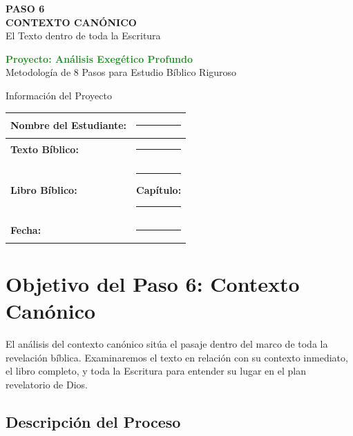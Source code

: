 \documentclass[11pt,a4paper]{article}
\begin{document}
\begin{center}
    {\Huge\color{forestgreen}\textbf{PASO 6}}\\[0.5cm]
    {\Large\color{sagegreen}\textbf{CONTEXTO CANÓNICO}}\\[0.3cm]
    {\large\color{papergray}El Texto dentro de toda la Escritura}\\[1cm]
    
    \begin{tcolorbox}[colback=olivegreen!10, colframe=olivegreen, width=0.8\textwidth]
        \centering
        \textcolor{forestgreen}{\textbf{Proyecto: Análisis Exegético Profundo}}\\
        \textcolor{papergray}{Metodología de 8 Pasos para Estudio Bíblico Riguroso}
    \end{tcolorbox}
\end{center}

\vspace{1cm}

\begin{infobox}{Información del Proyecto}
\begin{tabularx}{\textwidth}{|X|X|}
\hline
\textbf{Nombre del Estudiante:} & \rule{6cm}{0.4pt} \\[0.8cm]
\hline
\textbf{Texto Bíblico:} & \rule{6cm}{0.4pt} \\[0.8cm]
\hline
\textbf{Libro Bíblico:} & \rule{3cm}{0.4pt} \quad \textbf{Capítulo:} \rule{2cm}{0.4pt} \\[0.8cm]
\hline
\textbf{Fecha:} & \rule{6cm}{0.4pt} \\[0.8cm]
\hline
\end{tabularx}
\end{infobox}

\section{Objetivo del Paso 6: Contexto Canónico}

El análisis del contexto canónico sitúa el pasaje dentro del marco de toda la revelación bíblica. Examinaremos el texto en relación con su contexto inmediato, el libro completo, y toda la Escritura para entender su lugar en el plan revelatorio de Dios.

\subsection{Descripción del Proceso}
\end{document}

